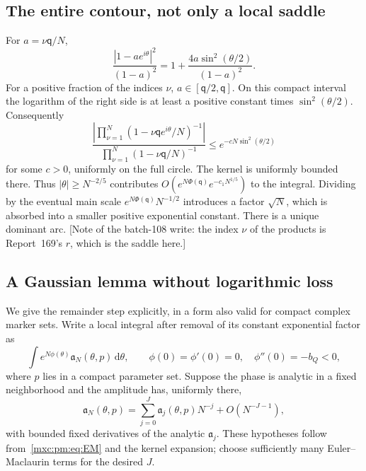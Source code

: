 \documentclass[11pt]{article}
\numberwithin{equation}{section}
\theoremstyle{definition}
\theoremstyle{remark}
\newcommand{\dd}{\,\mathrm d}
\begin{document}
\subsection{The entire contour, not only a local saddle}
For $a=\nu\mathsf q/N$,
\[
 \frac{|1-ae^{i\theta}|^2}{(1-a)^2}
 =1+\frac{4a\sin^2(\theta/2)}{(1-a)^2}.
\]
For a positive fraction of the indices $\nu$, $a\in[\mathsf q/2,\mathsf q]$. On
this compact interval the logarithm of the right side is at least a positive
constant times $\sin^2(\theta/2)$. Consequently
\begin{equation}\label{mxc:pm:eq:minor}
 \frac{\left|\prod_{\nu=1}^N(1-\nu\mathsf qe^{i\theta}/N)^{-1}\right|}
      {\prod_{\nu=1}^N(1-\nu\mathsf q/N)^{-1}}
 \le e^{-cN\sin^2(\theta/2)}
\end{equation}
for some $c>0$, uniformly on the full circle. The kernel is uniformly
bounded there. Thus $|\theta|\ge N^{-2/5}$ contributes
$O(e^{N\Phi(\mathsf q)}e^{-c_1N^{1/5}})$ to the integral. Dividing by the
eventual main scale $e^{N\Phi(\mathsf q)}N^{-1/2}$ introduces a factor
$\sqrt N$, which is absorbed into a smaller positive exponential constant.
There is a unique dominant arc. [Note of the batch-108 write: the index $\nu$
of the products is Report~169's $r$, which is the saddle here.]

\subsection{A Gaussian lemma without logarithmic loss}\label{mxc:pm:sec:gauss}
We give the remainder step explicitly, in a form also valid for compact
complex marker sets. Write a local integral after removal of its constant
exponential factor as
\[
 \int e^{N\phi(\theta)}\mathfrak a_N(\theta,p)\dd\theta,
 \qquad \phi(0)=\phi'(0)=0,\quad \phi''(0)=-b_Q<0,
\]
where $p$ lies in a compact parameter set. Suppose the phase is analytic in a
fixed neighborhood and the amplitude has, uniformly there,
\[
 \mathfrak a_N(\theta,p)=\sum_{j=0}^J\mathfrak a_j(\theta,p)N^{-j}+O(N^{-J-1}),
\]
with bounded fixed derivatives of the analytic $\mathfrak a_j$. These
hypotheses follow from~\eqref{mxc:pm:eq:EM} and the kernel expansion; choose
sufficiently many Euler--Maclaurin terms for the desired $J$.
\end{document}
